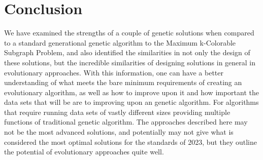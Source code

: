 \documentclass{article}
\begin{document}
 \section{Conclusion}
    \hspace{\parindent} We have examined the strengths of a couple of genetic solutions when compared to a standard generational genetic algorithm to the Maximum k-Colorable Subgraph Problem, and also identified the similarities in not only the design of these solutions, but the incredible similarities of designing solutions in general in evolutionary approaches. With this information, one can have a better understanding of what meets the bare minimum requirements of creating an evolutionary algorithm, as well as how to improve upon it and how important the data sets that will be are to improving upon an genetic algorithm. For algorithms that require running data sets of vastly different sizes providing multiple functions of traditional genetic algorithm. The approaches described here may not be the most advanced solutions, and potentially may not give what is considered the most optimal solutions for the standards of 2023, but they outline the potential of evolutionary approaches quite well.
\end{document}
